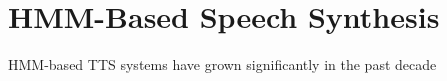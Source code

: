\section{HMM-Based Speech Synthesis}
\label{hmm_synthesis}
HMM-based TTS systems have grown significantly in the past decade 